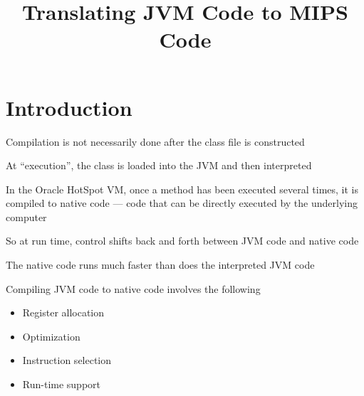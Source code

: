 \documentclass[8pt,a4paper,compress]{beamer}
\title{Translating JVM Code to MIPS Code}
\date{}
\begin{document}
\begin{frame}
\vfill
\titlepage
\end{frame}

\section{Introduction}
\begin{frame}[fragile]
\pause

Compilation is not necessarily done after the class file is constructed

\pause
\bigskip

At ``execution'', the class is loaded into the JVM and then interpreted

\pause
\bigskip

In the Oracle HotSpot VM, once a method has been executed several times, it is compiled to native code --- code that can be directly executed by the underlying computer

\pause
\bigskip

So at run time, control shifts back and forth between JVM code and native code

\pause
\bigskip

The native code runs much faster than does the interpreted JVM code

\pause
\bigskip

Compiling JVM code to native code involves the following
\begin{itemize}
\item Register allocation
\item Optimization
\item Instruction selection
\item Run-time support
\end{itemize}
\end{frame}
\end{document}

